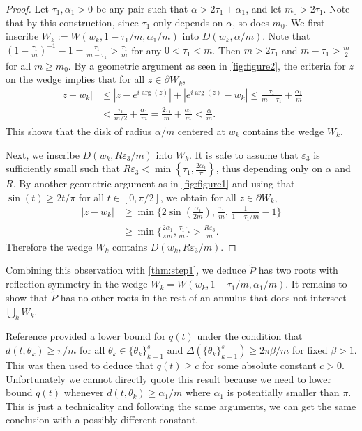 \documentclass[11pt]{article}
\theoremstyle{definition}
\numberwithin{theorem}{section}
\numberwithin{equation}{section}
\renewcommand{\tilde}{\widetilde}
\renewcommand{\epsilon}{\varepsilon}
\numberwithin{equation}{section}
\begin{document}
\begin{proof}
    Let $\tau_1, \alpha_1 >0$ be any pair such that $\alpha > 2\tau_1 + \alpha_1$, and let $m_0 > 2\tau_1$. Note that by this construction, since $\tau_1$ only depends on $\alpha$, so does $m_0$. 
    We first inscribe $W_k := W(w_k,1-\tau_1/m,\alpha_1/m)$ into $D(w_k,\alpha/m)$. Note that $\left( 1-\frac{\tau_1}m \right)^{-1} -1= \frac{\tau_1}{m-\tau_1} > \frac{\tau_1}m$ for any $0<\tau_1<m$. Then $m>2\tau_1$ and $m-\tau_1>\frac m2$ for all $m\geq m_0$. By a geometric argument as seen in \cref{fig:figure2}, the criteria for $z$ on the wedge implies that for all $z\in \partial W_k$,
    \begin{align*}
        |z-w_k| &\leq |z - e^{i\arg(z)}| + |e^{i\arg(z)} - w_k| \leq \frac {\tau_1}{m-\tau_1}  + \frac {\alpha_1}m \\ 
        &< \frac{\tau_1}{m/2} + \frac {\alpha_1}m = \frac{2\tau_1}m + \frac {\alpha_1}m < \frac \alpha m. 
    \end{align*}
    This shows that the disk of radius $\alpha/m$ centered at $w_k$ contains the wedge $W_k$. 
    
    Next, we inscribe $D(w_k,R\epsilon_3/m)$ into $W_k$. It is safe to assume that $\epsilon_3$ is sufficiently small such that $R\epsilon_3 < \min \left\{ \tau_1, \frac{2\alpha_1}\pi \right\}$, thus depending only on $\alpha$ and $R$. By another geometric argument as in \cref{fig:figure1} and using that $\sin(t)\geq 2t/\pi$ for all $t\in [0,\pi/2]$, we obtain for all $z\in \partial W_k$,
    \begin{align*}
        |z-w_k| &\geq \min\Big\{2\sin\left(\frac{\alpha_1}{2m}\right), \, \frac {\tau_1} m, \, \frac 1{1-\tau_1/m} -1 \Big\} \\
        &\geq \min\Big\{\frac{2\alpha_1}{\pi m}, \frac {\tau_1}m \Big\} 
        > \frac {R\epsilon_3}m. 
    \end{align*}
    Therefore the wedge $W_k$ contains $D(w_k,R\epsilon_3/m)$. 
\end{proof}

Combining this observation with \cref{thm:step1}, we deduce $\tilde P$ has two roots with reflection symmetry in the wedge $W_k = W(w_k,1-\tau_1/m,\alpha_1/m)$. It remains to show that $\tilde P$ has no other roots in the rest of an annulus that does not intersect $\bigcup_k W_k$. 

Reference \cite[Lemma 9.6]{fannjiang2025optimality} provided a lower bound for $q(t)$ under the condition that $d(t,\theta_k)\geq \pi/m$ for all $\theta_k\in\{\theta_k\}_{k=1}^s$ and $\Delta(\{\theta_k\}_{k=1}^s)\geq 2\pi \beta/m$ for fixed $\beta>1$. This was then used to deduce that $q(t)\geq c$ for some absolute constant $c>0$. Unfortunately we cannot directly quote this result because we need to lower bound $q(t)$ whenever $d(t,\theta_k)\geq \alpha_1/m$ where $\alpha_1$ is potentially smaller than $\pi$. This is just a technicality and following the same arguments, we can get the same conclusion with a possibly different constant.  
\end{document}
